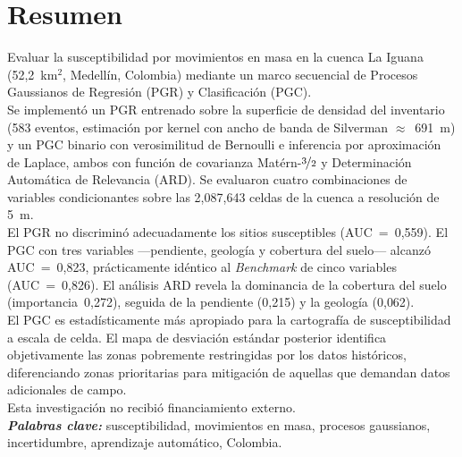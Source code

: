 \documentclass[letterpaper,11pt]{tec}
\begin{document}

\renewcommand{\baselinestretch}{1.25}
\vspace{-0.5cm}
\footnotesize{




\section*{\color{black}Resumen}
 Evaluar la susceptibilidad por movimientos en masa en la cuenca La Iguana
(52{,}2~km$^2$, Medellín, Colombia) mediante un marco secuencial de Procesos Gaussianos de Regresión (PGR)
y Clasificación (PGC).
\\ Se implementó un PGR entrenado sobre la superficie de densidad del inventario
(583 eventos, estimación por kernel con ancho de banda de Silverman $\approx$~691~m) y un PGC binario con
verosimilitud de Bernoulli e inferencia por aproximación de Laplace, ambos con función de covarianza
Matérn-$\nicefrac{3}{2}$ y Determinación Automática de Relevancia (ARD). Se evaluaron cuatro combinaciones de
variables condicionantes sobre las 2{,}087{,}643 celdas de la cuenca a resolución de 5~m.
\\ El PGR no discriminó adecuadamente los sitios susceptibles (AUC~=~0{,}559).
El PGC con tres variables ---pendiente, geología y cobertura del suelo--- alcanzó AUC~=~0{,}823,
prácticamente idéntico al \textit{Benchmark} de cinco variables (AUC~=~0{,}826). El análisis ARD revela la
dominancia de la cobertura del suelo (importancia~0{,}272), seguida de la pendiente (0{,}215) y la
geología (0{,}062).
\\ El PGC es estadísticamente más apropiado para la cartografía de susceptibilidad
a escala de celda. El mapa de desviación estándar posterior identifica objetivamente las zonas pobremente
restringidas por los datos históricos, diferenciando zonas prioritarias para mitigación de aquellas que
demandan datos adicionales de campo.
\\ Esta investigación no recibió financiamiento externo.
\\

\noindent\textbf{\textit{Palabras clave:}} susceptibilidad, movimientos en masa, procesos gaussianos, incertidumbre, aprendizaje automático, Colombia.




}
\end{document}
